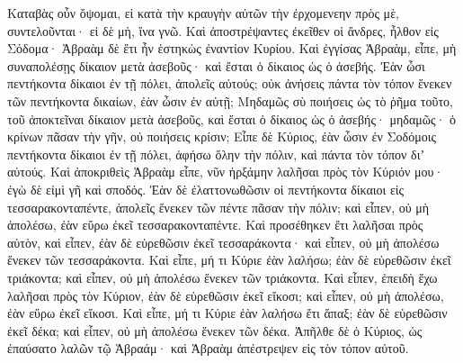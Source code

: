 {Καταβὰς οὖν ὄψομαι, εἰ κατὰ τὴν κραυγὴν αὐτῶν τὴν ἐρχομενεην πρὸς μὲ, συντελοῦνται· εἰ δὲ μὴ, ἵνα γνῶ.
Καὶ ἀποστρέψαντες ἐκεῖθεν οἱ ἄνδρες, ἦλθον εἰς Σόδομα· Ἁβραὰμ δὲ ἔτι ἦν ἑστηκὼς ἐναντίον Κυρίου.
Καὶ ἐγγίσας Ἁβραὰμ, εἶπε, μὴ συναπολέσῃς δίκαιον μετὰ ἀσεβοῦς· καὶ ἔσται ὁ δίκαιος ὡς ὁ ἀσεβής.
Ἐὰν ὦσι πεντήκοντα δίκαιοι ἐν τῇ πόλει, ἀπολεῖς αὐτούς; οὐκ ἀνήσεις πάντα τὸν τόπον ἕνεκεν τῶν πεντήκοντα δικαίων, ἐὰν ὦσιν ἐν αὐτῇ;
Μηδαμῶς σὺ ποιήσεις ὡς τὸ ῥῆμα τοῦτο, τοῦ ἀποκτεῖναι δίκαιον μετὰ ἀσεβοῦς, καὶ ἔσται ὁ δίκαιος ὡς ὁ ἀσεβής· μηδαμῶς· ὁ κρίνων πᾶσαν τὴν γῆν, οὐ ποιήσεις κρίσιν;
Εἶπε δὲ Κύριος, ἐὰν ὦσιν ἐν Σοδόμοις πεντήκοντα δίκαιοι ἐν τῇ πόλει, ἀφήσω ὅλην τὴν πόλιν, καὶ πάντα τὸν τόπον διʼ αὐτούς.
Καὶ ἀποκριθεὶς Ἁβραὰμ εἶπε, νῦν ἠρξάμην λαλῆσαι πρὸς τὸν Κύριόν μου· ἐγὼ δὲ εἰμὶ γῆ καὶ σποδός.
Ἐὰν δὲ ἐλαττονωθῶσιν οἱ πεντήκοντα δίκαιοι εἰς τεσσαρακονταπέντε, ἀπολεῖς ἕνεκεν τῶν πέντε πᾶσαν τὴν πόλιν; καὶ εἶπεν, οὐ μὴ ἀπολέσω, ἐὰν εὕρω ἐκεῖ τεσσαρακονταπέντε.
Καὶ προσέθηκεν ἔτι λαλῆσαι πρὸς αὐτὸν, καὶ εἶπεν, ἐὰν δὲ εὑρεθῶσιν ἐκεῖ τεσσαράκοντα· καὶ εἶπεν, οὐ μὴ ἀπολέσω ἕνεκεν τῶν τεσσαράκοντα.
Καὶ εἶπε, μή τι Κύριε ἐὰν λαλήσω; ἐὰν δὲ εὑρεθῶσιν ἐκεῖ τριάκοντα; καὶ εἶπεν, οὐ μὴ ἀπολέσω ἕνεκεν τῶν τριάκοντα.
Καὶ εἶπεν, ἐπειδὴ ἔχω λαλῆσαι πρὸς τὸν Κύριον, ἐὰν δὲ εὑρεθῶσιν ἐκεῖ εἴκοσι; καὶ εἶπεν, οὐ μὴ ἀπολέσω, ἐὰν εὕρω ἐκεῖ εἴκοσι.
Καὶ εἶπε, μή τι Κύριε ἐὰν λαλήσω ἔτι ἅπαξ; ἐὰν δὲ εὑρεθῶσιν ἐκεῖ δέκα; καὶ εἶπεν, οὐ μὴ ἀπολέσω ἕνεκεν τῶν δέκα.
Ἀπῆλθε δὲ ὁ Κύριος, ὡς ἐπαύσατο λαλῶν τῷ Ἁβραάμ· καὶ Ἁβραὰμ ἀπέστρεψεν εἰς τὸν τόπον αὐτοῦ.

}
